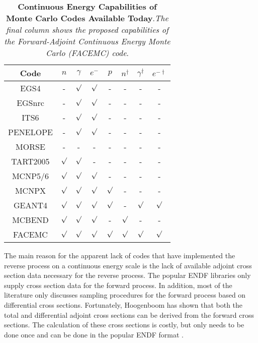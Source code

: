 \begin{table}[ht]
\label{table:monte_carlo_codes_today}
  \caption{\textbf{Continuous Energy Capabilities of Monte Carlo Codes Available
      Today}.\textit{The final column shows the proposed capabilities of the 
      Forward-Adjoint Continuous Energy Monte Carlo (FACEMC) code}.}
  \centering
  \begin{tabular}{c c c c c c c c }
    \hline\hline
    Code & $n$ & $\gamma$ & $e^-$ & $p$ & $n^{\dagger}$ & $\gamma^{\dagger}$ & $e^{-\dagger}$ \\ [0.5ex]
    \hline
    EGS4 & - & $\surd$ & $\surd$ & - & - & - & -  \\
    EGSnrc & - & $\surd$ & $\surd$ & - & - & - & - \\
    ITS6 & - & $\surd$ & $\surd$ & - & - & - & - \\
    PENELOPE & - & $\surd$ & $\surd$ & - & - & - & - \\
    MORSE & - & - & - & - & - & - & - \\
    TART2005 & $\surd$ & $\surd$ & - & - & - & - & - \\
    MCNP5/6 & $\surd$ & $\surd$ & $\surd$ & - & - & - & - \\
    MCNPX & $\surd$ & $\surd$ & $\surd$ & $\surd$ & - & - & - \\
    GEANT4 & $\surd$ & $\surd$ & $\surd$ & $\surd$ & - & $\surd$ & $\surd$ \\
    MCBEND & $\surd$ & $\surd$ & $\surd$ & - & $\surd$ & - & - \\ [1ex]
    \hline
    FACEMC & $\surd$ & $\surd$ & $\surd$ & $\surd$ & $\surd$ & $\surd$ & $\surd$ \\ [1ex]
    \hline
  \end{tabular}
  \label{table:mccodes}
\end{table}

The main reason for the apparent lack of 
codes that have implemented the reverse process on a continuous energy scale is
the lack of available adjoint cross section data necessary for the reverse 
process. The popular ENDF libraries only supply cross section data for the 
forward process. In addition, most of the literature only discusses sampling 
procedures for the forward process based on differential cross sections. 
Fortunately, Hoogenboom has shown that both the total and 
differential adjoint cross sections can be derived from the forward cross 
sections. The calculation of these cross sections is costly, but only needs to 
be done once and can be done in the popular ENDF format
\citep{hoogenboom_adjoint_1977}. 

